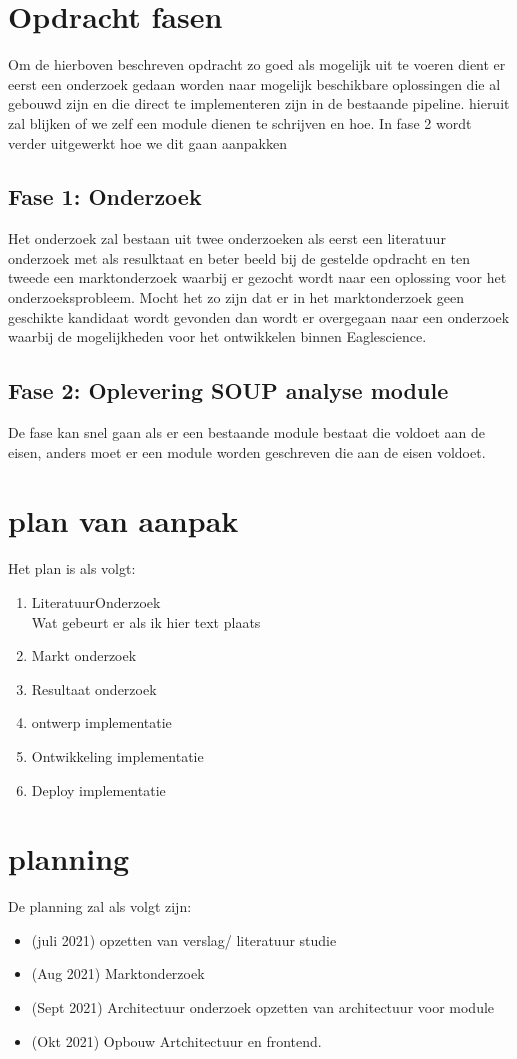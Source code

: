 \section{Opdracht fasen}
Om de hierboven beschreven opdracht zo goed als mogelijk uit te voeren dient er eerst een onderzoek gedaan worden naar mogelijk beschikbare oplossingen die al gebouwd zijn en die direct te implementeren zijn in de bestaande pipeline. hieruit zal blijken of we zelf een module dienen te schrijven en hoe. In fase 2 wordt verder uitgewerkt hoe we dit gaan aanpakken

\subsection{Fase 1: Onderzoek}
Het onderzoek zal bestaan uit twee onderzoeken als eerst een literatuur onderzoek met als resulktaat en beter beeld bij de gestelde opdracht en ten tweede een marktonderzoek waarbij er gezocht wordt naar een oplossing voor het onderzoeksprobleem. Mocht het zo zijn dat er in het marktonderzoek geen geschikte kandidaat wordt gevonden dan wordt er overgegaan naar een onderzoek waarbij de mogelijkheden voor het ontwikkelen binnen Eaglescience. 

\subsection{Fase 2: Oplevering SOUP analyse module}
De fase kan snel gaan als er een bestaande module bestaat die voldoet aan de eisen, anders moet er een module worden geschreven die aan de eisen voldoet. 

\section{plan van aanpak}
Het plan is als volgt:
\begin{enumerate}
\item LiteratuurOnderzoek
\\ Wat gebeurt er als ik hier text plaats
\item Markt onderzoek
\item Resultaat onderzoek
\item ontwerp implementatie
\item Ontwikkeling implementatie
\item Deploy implementatie
\end{enumerate}

\section{planning}
De planning zal als volgt zijn:
\begin{itemize}
\item (juli 2021) opzetten van verslag/ literatuur studie
\item (Aug 2021) Marktonderzoek
\item (Sept  2021) Architectuur onderzoek opzetten van architectuur voor module
\item (Okt 2021) Opbouw Artchitectuur en frontend. 
\end{itemize}


